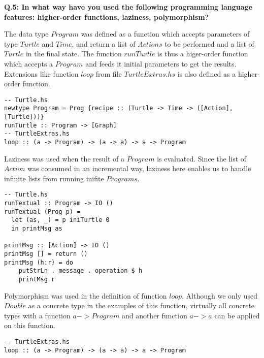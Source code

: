 \documentclass[10pt]{article}
\begin{document}
\textbf{Q.5: In what way have you used the following programming language features: higher-order functions, laziness, polymorphism?}

The data type $Program$ was defined as a function which accepts parameters of type $Turtle$ and $Time$, and return a list of $Actions$ to be performed and a list of $Turtle$ in the final state. The function $runTurtle$ is thus a higer-order function which accepts a $Program$ and feeds it initial parameters to get the results. Extensions like function $loop$ from file $TurtleExtras.hs$ is also defined as a higher-order function.
\begin{lstlisting}
-- Turtle.hs
newtype Program = Prog {recipe :: (Turtle -> Time -> ([Action], [Turtle]))}
runTurtle :: Program -> [Graph]
-- TurtleExtras.hs
loop :: (a -> Program) -> (a -> a) -> a -> Program
\end{lstlisting}

Laziness was used when the result of a $Program$ is evaluated. Since the list of $Action$ was consumed in an incremental way, laziness here enables us to handle infinite lists from running inifite $Programs$.
\begin{lstlisting}
-- Turtle.hs
runTextual :: Program -> IO ()
runTextual (Prog p) =
  let (as, _) = p iniTurtle 0
  in printMsg as

printMsg :: [Action] -> IO ()
printMsg [] = return ()
printMsg (h:r) = do
    putStrLn . message . operation $ h
    printMsg r
\end{lstlisting}

Polymorphism was used in the definition of function $loop$. Although we only used $Double$ as a concrete type in the examples of this function, virtually all concrete types with a function $a -> Program$ and another function $a -> a$ can be applied on this function.
\begin{lstlisting}
-- TurtleExtras.hs
loop :: (a -> Program) -> (a -> a) -> a -> Program
\end{lstlisting}
\end{document}
